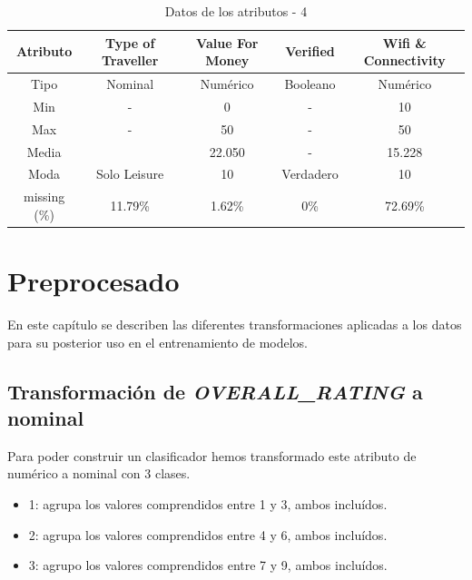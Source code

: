 \documentclass[12pt]{report} %
\begin{document}
\begin{table}[H]
    \begin{center}
        \begin{tabular}{@{}ccccc@{}}
            \toprule
            Atributo & Type of Traveller & Value For Money & Verified  & Wifi \& Connectivity \\ 
            \midrule
            Tipo     & Nominal           & Numérico        & Booleano  & Numérico             \\ 
            Min      & -                 & 0               & -         & 10                   \\ 
            Max      & -                 & 50              & -         & 50                   \\ 
            Media    &                   & 22.050          & -         & 15.228               \\ 
            Moda     & Solo Leisure      & 10              & Verdadero & 10                   \\ 
            missing (\%) & 11.79\%       & 1.62\%          & 0\%       & 72.69\%              \\ 
            \bottomrule
        \end{tabular} 
        \caption{Datos de los atributos - 4}
    \end{center}
\end{table}

\chapter{Preprocesado}
\label{chap:preprocess}
En este capítulo se describen las diferentes transformaciones aplicadas a los datos para su posterior uso en el entrenamiento de modelos.

\section{Transformación de \textit{OVERALL\_RATING} a nominal}
\label{sec:overalltransform}
Para poder construir un clasificador hemos transformado este atributo de numérico a nominal con 3 clases.
\begin{itemize}
    \item 1: agrupa los valores comprendidos entre 1 y 3, ambos incluídos.
    \item 2: agrupa los valores comprendidos entre 4 y 6, ambos incluídos.
    \item 3: agrupo los valores comprendidos entre 7 y 9, ambos incluídos.
\end{itemize}
\end{document}
